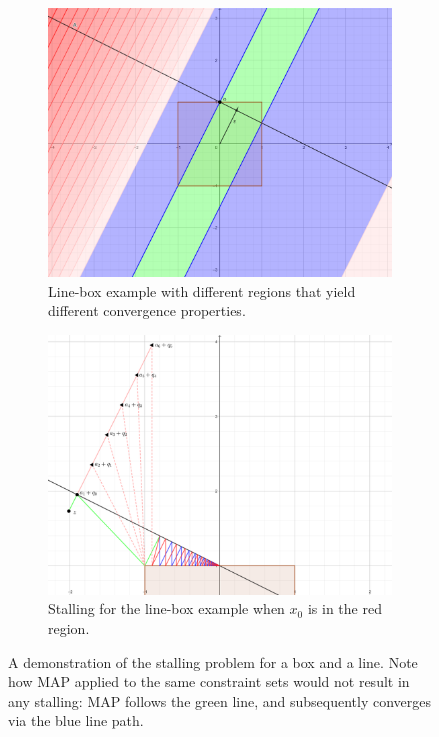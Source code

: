 \documentclass[hidelinks]{article}
\begin{document}
\begin{figure}[h]
    \centering
    
    \begin{subfigure}[t]{0.49\textwidth}
        \centering
        \includegraphics[width=1\textwidth]{Latex/Current Version/Figures/StallingRegionsHand.png}
        \caption{Line-box example with different regions that yield different convergence properties.}
        \label{fig:region}
    \end{subfigure}
    \hfill
    \begin{subfigure}[t]{0.49\textwidth}
        \centering
        \includegraphics[width=1\textwidth]{Latex/Current Version/Figures/DifferentSequences.png}
        \caption{Stalling for the line-box example when $x_0$ is in the red region.}
        \label{fig:stalling}
    \end{subfigure}
    \caption{A demonstration of the stalling problem for a box and a line. Note how MAP applied to the same constraint sets would not result in any stalling: MAP follows the green line, and subsequently converges via the blue line path.}
    \label{fig:baushkeStall}
\end{figure}
%
\newpage
%
\end{document}
